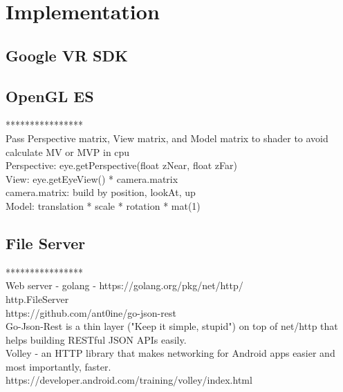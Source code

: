 \label{chapter-implementation}
\chapter{Implementation}

\section{Google VR SDK}

\section{OpenGL ES}

****************\\
Pass Perspective matrix, View matrix, and Model matrix to shader to avoid calculate MV or MVP in cpu\\
Perspective: eye.getPerspective(float zNear, float zFar)\\
View: eye.getEyeView() * camera.matrix\\
camera.matrix: build by position, lookAt, up\\
Model: translation * scale * rotation * mat(1)\\

\section{File Server}

****************\\
Web server - golang - https://golang.org/pkg/net/http/\\
http.FileServer\\
https://github.com/ant0ine/go-json-rest\\
Go-Json-Rest is a thin layer ("Keep it simple, stupid") on top of net/http that helps building RESTful JSON APIs easily.\\
Volley - an HTTP library that makes networking for Android apps easier and most importantly, faster.\\
https://developer.android.com/training/volley/index.html\\

